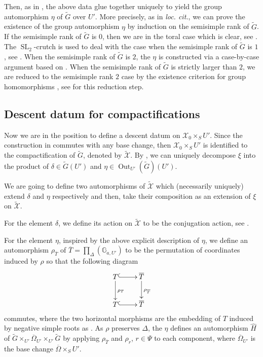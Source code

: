 \documentclass[11pt, reqno]{amsart}
\theoremstyle{plain}
\theoremstyle{definition}
\DeclareMathOperator{\Out}{Out}	%
\DeclareMathOperator{\SL}{SL}			%
\begin{document}
Then, as in \cite[exposé~XXIII, proof of théorème~4.1]{SGA3III}, the above data glue together uniquely to yield the group automorphism $\eta$ of $\widetilde{G}$ over $U'$. More precisely, as in \emph{loc. cit.}, we can prove the existence of the group automorphism $\eta$ by induction on the semisimple rank of $\widetilde{G}$. If the semisimple rank of $\widetilde{G}$ is $0$, then we are in the toral case which is clear, see \cite[exposé~XXIII, 4.1.1]{SGA3III}. The $\SL_2$-crutch is used to deal with the case when the semisimple rank of $\widetilde{G}$ is $1$, see \cite[exposé~XXIII, 4.1.2]{SGA3III}. When the semisimple rank of $\widetilde{G}$ is $2$, the $\eta$ is constructed via a case-by-case argument \cite[exposé~XXIII, 4.1.4-4.1.8]{SGA3III} based on \cite[exposé~XXIII, corollaire~2.5]{SGA3III}. When the semisimple rank of $\widetilde{G}$ is strictly larger than $2$, we are reduced to the semisimple rank $2$ case by the existence criterion for group homomorphisms \cite[exposé~XXIII, corollaire~2.4]{SGA3III}, see \cite[exposé~XXIII, 4.1.9]{SGA3III} for this reduction step.


\subsection{Descent datum for compactifications}
Now we are in the position to define a descent datum on $\mathcal{X}_{0}\times_S U'$. Since the construction in  commutes with any base change, then $\mathcal{X}_0 \times_S U'$ is identified to the compactification of $\widetilde{G}$, denoted by $\widetilde{\mathcal{X}}$.
By , we can uniquely decompose $\xi$ into the product of $\delta\in\widetilde{G}(U')$ and $\eta\in\Out_{U'}(\widetilde{G})(U')$.

 We are going to define two automorphisms of  $\widetilde{\mathcal{X}}$ which (necessarily uniquely) extend $\delta$ and $\eta$ respectively and then, take their composition as an extension of $\xi$ on $\widetilde{\mathcal{X}}$. 

For the element $\delta$, we define its action on $\widetilde{\mathcal{X}}$ to be the conjugation action, see .

For the element $\eta$, inspired by the above explicit description of $\eta$, we define an automorphism $\rho_{\overline{T}}$ of $\overline{T}=\prod_{\Delta}(\mathbb{G}_{a,U'})$ to be the permutation of coordinates induced by $\rho$ so that the following diagram    
$$\xymatrix{
T \ar@{^{(}->}[r] \ar[d]^{\rho_T}& \overline{T}\ar[d]^{\rho_{\overline{T}}}\\
T \ar@{^{(}->}[r] & \overline{T}
}$$
commutes, where the two horizontal morphisms are the embedding of $T$ induced by negative simple roots as . As $\rho$ preserves $\Delta$, the $\eta$ defines an automorphism $\hat{H}$ of $\widetilde{G}\times_{U'}\overline{\Omega}_{U'}\times_{U'} \widetilde{G}$ by applying $\rho_{\overline{T}}$ and $\rho_r$, $r\in\Psi$ to each component, where $\overline{\Omega}_{U'}$ is the base change $\overline{\Omega}\times_{S}U'$.
\end{document}
